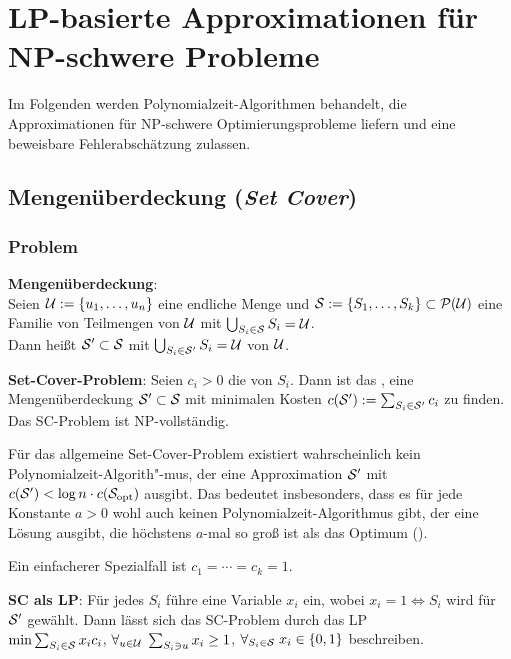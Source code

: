 \chapter{%
    LP-basierte Approximationen für NP-schwere Probleme%
}

Im Folgenden werden Polynomialzeit-Algorithmen behandelt, die Approximationen für NP-schwere
Optimierungsprobleme liefern und eine beweisbare Fehlerabschätzung zulassen.

\section{%
    Mengenüberdeckung (\emph{Set Cover})%
}

\subsection{%
    Problem%
}

\textbf{Mengenüberdeckung}:\\
Seien $\U := \{u_1, \dotsc, u_n\}$ eine endliche Menge und
$\S := \{S_1, \dotsc, S_k\} \subset \P(\U)$ eine Familie von Teilmengen von $\U$
mit $\bigcup_{S_i \in \S} S_i = \U$.\\
Dann heißt $\S' \subset \S$ mit $\bigcup_{S_i \in \S'} S_i = \U$
 von $\U$.

\textbf{Set-Cover-Problem}:
Seien $c_i > 0$ die  von $S_i$.
Dann ist das ,
eine Mengenüberdeckung $\S' \subset \S$ mit minimalen Kosten
$c(\S') := \sum_{S_i \in \S'} c_i$ zu finden.\\
Das SC-Problem ist NP-vollständig.

Für das allgemeine Set-Cover-Problem existiert wahrscheinlich kein Polynomialzeit-Algorith"-mus,
der eine Approximation $\S'$ mit $c(\S') < \log n \cdot c(\S_\opt)$ ausgibt.
Das bedeutet insbesonders, dass es für jede Konstante $a > 0$ wohl auch keinen
Polynomialzeit-Algorithmus gibt, der
eine Lösung ausgibt, die höchstens $a$-mal so groß ist als das Optimum
().

Ein einfacherer Spezialfall ist $c_1 = \dotsb = c_k = 1$.

\linie

\textbf{SC als LP}:
Für jedes $S_i$ führe eine Variable $x_i$ ein, wobei $x_i = 1 \iff S_i$ wird für $\S'$ gewählt.
Dann lässt sich das SC-Problem durch das LP\\
$\min \sum_{S_i \in \S} x_i c_i$, $\forall_{u \in \U}\; \sum_{S_i \ni u} x_i \ge 1$,
$\forall_{S_i \in \S}\; x_i \in \{0, 1\}$ beschreiben.

